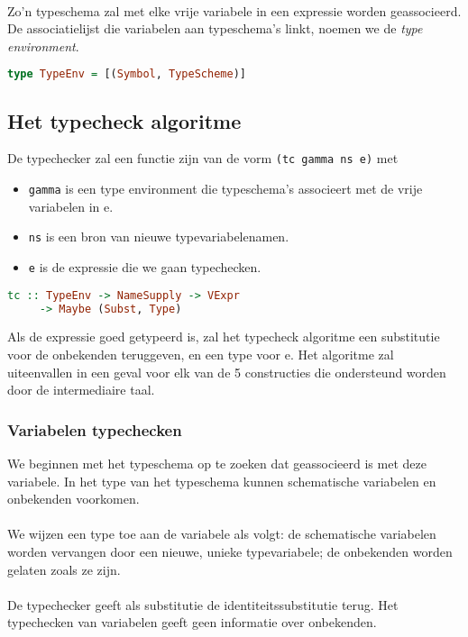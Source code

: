 \documentclass[a4paper,10pt]{article}
\begin{document}
\paragraph{}
Zo'n typeschema zal met elke vrije variabele in een expressie worden geassocieerd. De associatielijst die variabelen aan typeschema's linkt, noemen we de \emph{type environment}.
\begin{lstlisting}[language=Haskell,frame=single]
type TypeEnv = [(Symbol, TypeScheme)]
\end{lstlisting}

\subsection{Het typecheck algoritme}
De typechecker zal een functie zijn van de vorm \texttt{(tc gamma ns e)} met
\begin{itemize}
  \item \texttt{gamma} is een type environment die typeschema's associeert met de vrije variabelen in e.
  \item \texttt{ns} is een bron van nieuwe typevariabelenamen.
  \item \texttt{e} is de expressie die we gaan typechecken.
\end{itemize}
\begin{lstlisting}[language=Haskell,frame=single]
  tc :: TypeEnv -> NameSupply -> VExpr
     -> Maybe (Subst, Type)
\end{lstlisting}
Als de expressie goed getypeerd is, zal het typecheck algoritme een substitutie voor de onbekenden teruggeven, en een type voor e.
Het algoritme zal uiteenvallen in een geval voor elk van de 5 constructies die ondersteund worden door de intermediaire taal.

\subsubsection{Variabelen typechecken}
We beginnen met het typeschema op te zoeken dat geassocieerd is met deze variabele.
In het type van het typeschema kunnen schematische variabelen en onbekenden voorkomen.
\paragraph{}
We wijzen een type toe aan de variabele als volgt: de schematische variabelen worden vervangen door een nieuwe, unieke typevariabele; de onbekenden worden gelaten zoals ze zijn.
\paragraph{}
De typechecker geeft als substitutie de identiteitssubstitutie terug. Het typechecken van variabelen geeft geen informatie over onbekenden.
\end{document}
